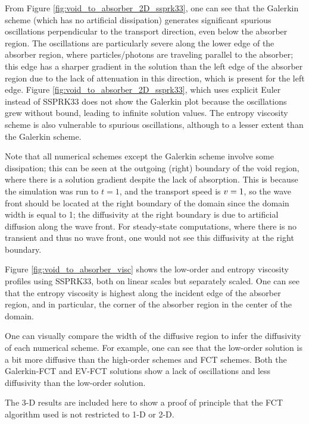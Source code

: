 From Figure \ref{fig:void_to_absorber_2D_ssprk33}, one can see that the
Galerkin scheme (which has no artificial dissipation) generates significant
spurious oscillations perpendicular to the transport direction, even below the
absorber region. The oscillations are particularly severe along the lower edge
of the absorber region, where particles/photons are traveling parallel to the
absorber; this edge has a sharper gradient in the solution than the left edge
of the absorber region due to the lack of attenuation in this direction, which
is present for the left edge. Figure \ref{fig:void_to_absorber_2D_ssprk33},
which uses explicit Euler instead of SSPRK33 does not show the Galerkin plot
because the oscillations grew without bound, leading to infinite solution
values. The entropy viscosity scheme is also vulnerable to spurious
oscillations, although to a lesser extent than the Galerkin scheme.

Note that all numerical schemes except the Galerkin scheme involve some
dissipation; this can be seen at the outgoing (right) boundary of the void
region, where there is a solution gradient despite the lack of
absorption. This is because the simulation was run to $t=1$, and the transport
speed is $v=1$, so the wave front should be located at the right
boundary of the domain since the domain width is equal to 1;
the diffusivity at the right boundary is due to artificial diffusion
along the wave front.
For steady-state computations, where there is no transient and
thus no wave front, one would not see this diffusivity
at the right boundary.

Figure \ref{fig:void_to_absorber_visc} shows the low-order and entropy
viscosity profiles using SSPRK33, both on linear scales but separately
scaled. One can see that the entropy viscosity
is highest along the incident edge of the absorber region, and in
particular, the corner of the absorber region in the center of the
domain.

One can visually compare the width of the diffusive region to infer the
diffusivity of each numerical scheme. For example, one can see that the
low-order solution is a bit more diffusive than the high-order schemes and FCT
schemes.  Both the Galerkin-FCT and EV-FCT solutions show a lack of
oscillations and less diffusivity than the low-order solution.

The 3-D results are included here to show a proof of principle
that the FCT algorithm used is not restricted to 1-D or 2-D.

